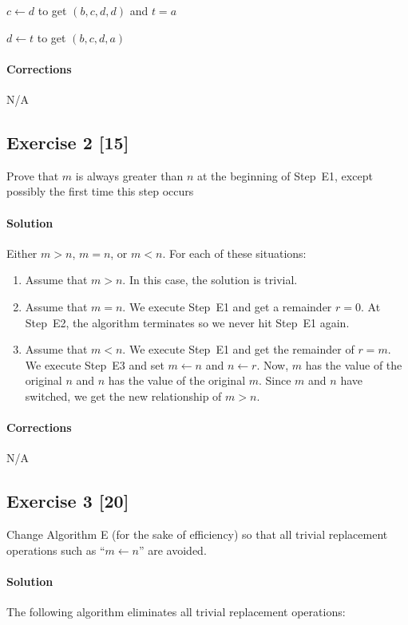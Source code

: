 \documentclass{report}
\newcommand{\say}[1]{``#1''}
\begin{document}
			$c \leftarrow d$ to get $(b,c,d,d)$ and $t=a$
			
			$d \leftarrow t$ to get $(b,c,d,a)$
			
			\paragraph{Corrections} N/A
		
		\subsection*{Exercise 2 [15]} 
		
			Prove that $m$ is always greater than $n$ at the beginning of Step~E1, except possibly the first time this step occurs
			
			\paragraph{Solution} Either $m > n$, $m=n$, or $m < n$. For each of these situations:
			\begin{enumerate}
				\item Assume that $m > n$. In this case, the solution is trivial.
				\item Assume that $m=n$. We execute Step~E1 and get a remainder $r=0$. At Step~E2, the algorithm terminates so we never hit Step~E1 again.
				\item Assume that $m < n$. We execute Step~E1 and get the remainder of $r=m$. We execute Step~E3 and set $m \leftarrow n$ and $n \leftarrow r$. Now, $m$ has the value of the original $n$ and $n$ has the value of the original $m$. Since $m$ and $n$ have switched, we get the new relationship of $m > n$.
			\end{enumerate}
			
			\paragraph{Corrections} N/A
		
		\subsection*{Exercise 3 [20]} 
		
			Change Algorithm E (for the sake of efficiency) so that all trivial replacement operations such as \say{$m \leftarrow n$} are avoided. 
			
			\paragraph{Solution} The following algorithm eliminates all trivial replacement operations:
			
\end{document}
